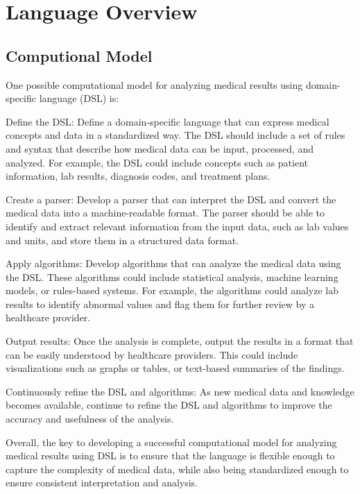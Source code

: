 \chapter{Language Overview}


\section{Computional Model}
One possible computational model for analyzing medical results using domain-specific language (DSL) is:

Define the DSL: Define a domain-specific language that can express medical concepts and data in a standardized way. The DSL should include a set of rules and syntax that describe how medical data can be input, processed, and analyzed. For example, the DSL could include concepts such as patient information, lab results, diagnosis codes, and treatment plans.
\begin{itemize}
\hitem Create a parser: Develop a parser that can interpret the DSL and convert the medical data into a machine-readable format. The parser should be able to identify and extract relevant information from the input data, such as lab values and units, and store them in a structured data format.

\hitem Apply algorithms: Develop algorithms that can analyze the medical data using the DSL. These algorithms could include statistical analysis, machine learning models, or rules-based systems. For example, the algorithms could analyze lab results to identify abnormal values and flag them for further review by a healthcare provider.

\hitem Output results: Once the analysis is complete, output the results in a format that can be easily understood by healthcare providers. This could include visualizations such as graphs or tables, or text-based summaries of the findings.

\hitem Continuously refine the DSL and algorithms: As new medical data and knowledge becomes available, continue to refine the DSL and algorithms to improve the accuracy and usefulness of the analysis.
\end{itemize}

Overall, the key to developing a successful computational model for analyzing medical results using DSL is to ensure that the language is flexible enough to capture the complexity of medical data, while also being standardized enough to ensure consistent interpretation and analysis.




